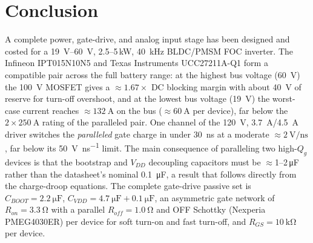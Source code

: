 \documentclass[journal,onecolumn,11pt]{IEEEtran}
\begin{document}
\section{Conclusion}\label{sec:concl}

A complete power, gate-drive, and analog input stage has been designed and costed for a
\SIrange{19}{60}{\volt}, \mbox{2.5--5\,kW}, \SI{40}{\kilo\hertz} BLDC/PMSM FOC inverter. The Infineon
IPT015N10N5 and Texas Instruments UCC27211A-Q1 form a compatible pair across the full battery range:
at the highest bus voltage (\SI{60}{\volt}) the \SI{100}{\volt} MOSFET gives a $\approx1.67\times$ DC
blocking margin with about \SI{40}{\volt} of reserve for turn-off overshoot, and at the lowest bus
voltage (\SI{19}{\volt}) the worst-case current reaches $\approx\SI{132}{\ampere}$ on the bus
($\approx\SI{60}{\ampere}$ per device), far below the $2\times\SI{250}{\ampere}$ rating of the
paralleled pair. One channel of the \SI{120}{\volt}, \SI{3.7}{\ampere}/\SI{4.5}{\ampere} driver
switches the \emph{paralleled} gate charge in under \SI{30}{\nano\second} at a moderate
$\approx\SI{2}{\volt\per\nano\second}$, far below its \SI{50}{\volt\per\nano\second} limit. The main
consequence of paralleling two high-$Q_g$ devices is that the bootstrap and $V_{DD}$ decoupling
capacitors must be $\approx$1--2\,\si{\micro\farad} rather than the datasheet's nominal
\SI{0.1}{\micro\farad}, a result that follows directly from the charge-droop equations. The complete
gate-drive passive set is $C_{BOOT}=\SI{2.2}{\micro\farad}$, $C_{VDD}=\SI{4.7}{\micro\farad}+\SI{0.1}{\micro\farad}$,
an asymmetric gate network of $R_{on}=\SI{3.3}{\ohm}$ with a parallel $R_{off}=\SI{1.0}{\ohm}$ and OFF
Schottky (Nexperia PMEG4030ER) per device for soft turn-on and fast turn-off, and $R_{GS}=\SI{10}{\kilo\ohm}$
per device.
\end{document}
